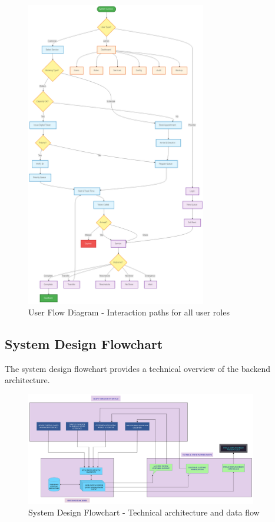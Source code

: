 \documentclass[12pt,a4paper]{report}
\begin{document}
\begin{figure}[h]
    \centering
    \includegraphics[width=0.70\textwidth]{flowchart(1).png}
    \caption{User Flow Diagram - Interaction paths for all user roles}
    \label{fig:user_flow}
\end{figure}

\subsection{System Design Flowchart}

The system design flowchart provides a technical overview of the backend architecture.

\begin{figure}[h]
    \centering
    \includegraphics[width=0.90\textwidth]{FlowChart (2).png}
    \caption{System Design Flowchart - Technical architecture and data flow}
    \label{fig:system_design}
\end{figure}
\end{document}
